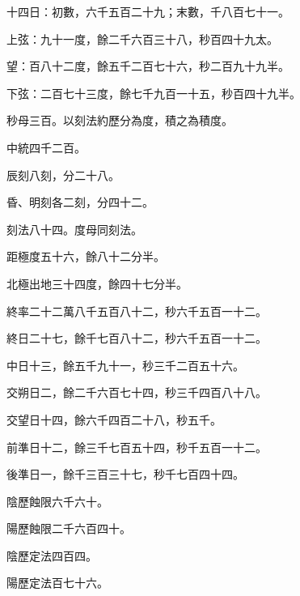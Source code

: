\begin{pinyinscope}
 十四日：初數，六千五百二十九；末數，千八百七十一。



 上弦：九十一度，餘二千六百三十八，秒百四十九太。



 望：百八十二度，餘五千二百七十六，秒二百九十九半。



 下弦：二百七十三度，餘七千九百一十五，秒百四十九半。



 秒母三百。以刻法約歷分為度，積之為積度。



 中統四千二百。



 辰刻八刻，分二十八。



 昏、明刻各二刻，分四十二。



 刻法八十四。度母同刻法。



 距極度五十六，餘八十二分半。



 北極出地三十四度，餘四十七分半。



 終率二十二萬八千五百八十二，秒六千五百一十二。



 終日二十七，餘千七百八十二，秒六千五百一十二。



 中日十三，餘五千九十一，秒三千二百五十六。



 交朔日二，餘二千六百七十四，秒三千四百八十八。



 交望日十四，餘六千四百二十八，秒五千。



 前準日十二，餘三千七百五十四，秒千五百一十二。



 後準日一，餘千三百三十七，秒千七百四十四。



 陰歷蝕限六千六十。



 陽歷蝕限二千六百四十。



 陰歷定法四百四。



 陽歷定法百七十六。




\end{pinyinscope}
